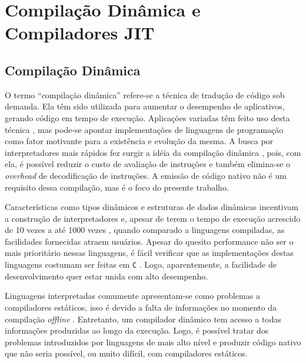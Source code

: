 \chapter{Compilação Dinâmica e Compiladores JIT}
\label{compdyn}

\section{Compilação Dinâmica}

O termo ``compilação dinâmica'' refere-se a técnica de tradução de
código sob demanda. Ela têm sido utilizada para aumentar o desempenho
de aplicativos, gerando código em tempo de execução. Aplicações
variadas têm feito uso desta técnica \cite{holzle}, mas pode-se apontar
implementações de linguagens de programação como fator motivante para
a existência e evolução da mesma. A busca por
interpretadores mais rápidos fez surgir a idéia da compilação dinâmica
\cite{holzle}, pois, com ela, é possível reduzir o custo de avaliação de
instruções e também elimina-se o \textit{overhead} de decodificação de
instruções.
A emissão de código nativo não é um requisito dessa compilação, mas é
o foco do presente trabalho.

Características como tipos dinâmicos e estruturas de dados dinâmicas
incentivam a construção de interpretadores
\cite{trustworthycompilers} e, apesar de terem o tempo de execução
acrescido de 10 vezes \cite{plezbert} a até 1000 vezes
\cite{trustworthycompilers}, quando comparado a linguagens compiladas, as
facilidades fornecidas atraem usuários. Apesar do quesito performance
não ser o mais prioritário nessas linguagens, é fácil verificar que as
implementações destas linguagens costumam ser feitas em \texttt{C}
\cite{dyla1}. Logo,
aparentemente, a facilidade de desenvolvimento quer estar unida com
alto desempenho.

Linguagens interpretadas comumente apresentam-se como problemas a
compiladores estáticos, isso é devido a falta de informações no momento
da compilação \textit{offline} \cite{holzle}.
Entretanto, um compilador dinâmico tem acesso a todas informações
produzidas ao longo da execução.
Logo, é possível tratar dos problemas
introduzidos por linguagens de mais alto nível e produzir código
nativo que não seria possível, ou muito difícil, com compiladores
estáticos.

